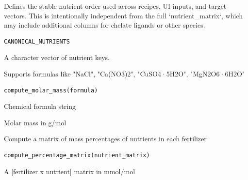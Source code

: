 \documentclass[a4paper]{book}
\begin{document}
%
\begin{Description}
Defines the stable nutrient order used across recipes, UI inputs, and target
vectors. This is intentionally independent from the full `nutrient\_matrix`,
which may include additional columns for chelate ligands or other species.
\end{Description}
%
\begin{Usage}
\begin{verbatim}
CANONICAL_NUTRIENTS
\end{verbatim}
\end{Usage}
%
\begin{Format}
A character vector of nutrient keys.
\end{Format}
%
\begin{Description}
Supports formulas like "NaCl", "Ca(NO3)2", "CuSO4·5H2O", "MgN2O6·6H2O"
\end{Description}
%
\begin{Usage}
\begin{verbatim}
compute_molar_mass(formula)
\end{verbatim}
\end{Usage}
%
\begin{Arguments}
\begin{ldescription}
\item[\code{formula}] Chemical formula string
\end{ldescription}
\end{Arguments}
%
\begin{Value}
Molar mass in g/mol
\end{Value}
%
\begin{Description}
Compute a matrix of mass percentages of nutrients in each fertilizer
\end{Description}
%
\begin{Usage}
\begin{verbatim}
compute_percentage_matrix(nutrient_matrix)
\end{verbatim}
\end{Usage}
%
\begin{Arguments}
\begin{ldescription}
\item[\code{nutrient\_matrix}] A [fertilizer x nutrient] matrix in mmol/mol
\end{ldescription}
\end{Arguments}
\end{document}
